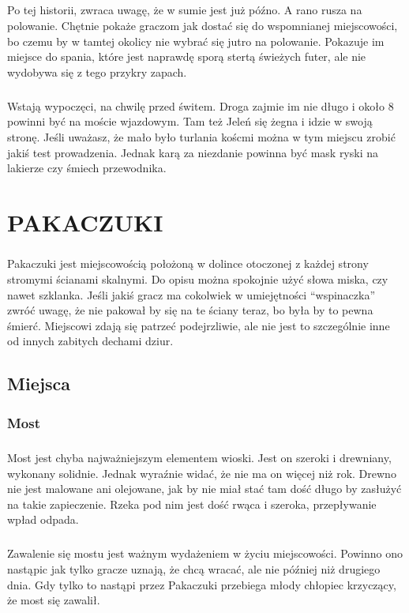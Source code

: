 \documentclass[ms,a4paper]{memoir}
\newcommand{\RED}[1]{\textcolor{red!50!black}{\MakeUppercase{#1}}}
\begin{document}
\paragraph{}
Po tej historii, zwraca uwagę, że w sumie jest już późno.
A rano rusza na polowanie.
Chętnie pokaże graczom jak dostać się do wspomnianej miejscowości, bo czemu by w tamtej okolicy nie wybrać się jutro na polowanie.
Pokazuje im miejsce do spania, które jest naprawdę sporą stertą świeżych futer, ale nie wydobywa się z tego przykry zapach.
\paragraph{}
Wstają wypoczęci, na chwilę przed świtem.
Droga zajmie im nie długo i około 8 powinni być na moście wjazdowym.
Tam też Jeleń się żegna i idzie w swoją stronę.
Jeśli uważasz, że mało było turlania koścmi można w tym miejscu zrobić jakiś test prowadzenia.
Jednak karą za niezdanie powinna być mask ryski na lakierze czy śmiech przewodnika.


\chapter{\RED{Pakaczuki}}

\paragraph{}
Pakaczuki jest miejscowością położoną w dolince otoczonej z każdej strony stromymi ścianami skalnymi.
Do opisu można spokojnie użyć słowa miska, czy nawet szklanka.
Jeśli jakiś gracz ma cokolwiek w umiejętności ``wspinaczka'' zwróć uwagę, że nie pakował by się na te ściany teraz, bo była by to pewna śmierć.
Miejscowi zdają się patrzeć podejrzliwie, ale nie jest to szczególnie inne od innych zabitych dechami dziur.
\section{Miejsca}

\subsection{Most}
\paragraph{}
Most jest chyba najważniejszym elementem wioski.
Jest on szeroki i drewniany, wykonany solidnie.
Jednak wyraźnie widać, że nie ma on więcej niż rok.
Drewno nie jest malowane ani olejowane, jak by nie miał stać tam dość długo by zasłużyć na takie zapieczenie.
Rzeka pod nim jest dość rwąca i szeroka, przepływanie wpład odpada.
\paragraph{}
Zawalenie się mostu jest ważnym wydażeniem w życiu miejscowości.
Powinno ono nastąpic jak tylko gracze uznają, że chcą wracać, ale nie później niż drugiego dnia.
Gdy tylko to nastąpi przez Pakaczuki przebiega młody chłopiec krzyczący, że most się zawalił.





\end{document}
